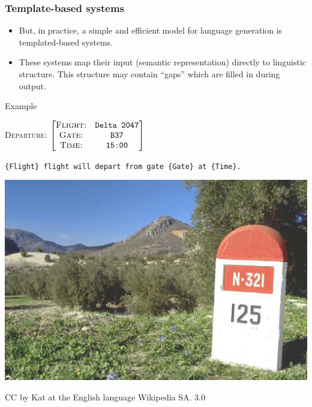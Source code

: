 \documentclass[11pt]{beamer}
\begin{document}
\begin{frame}
\frametitle{Template-based systems}
	\begin{itemize}
		\item But, in practice, a simple and efficient model for language generation is templated-based systems.
		\pause
		\item These systems map their input (semantic representation) directly to linguistic structure. This structure may contain ``gaps'' which are filled in during output.
	\end{itemize}
	\pause
	\begin{block}{Example}
		\vspace{10pt}
		\begin{center}
		\textsc{Departure:} \small 
				$\begin{bmatrix}
						\textsc{Flight:}    & \texttt{Delta 2047}\\ 
						\textsc{Gate:}     	& \texttt{B37}\\ 
						\textsc{Time:}  		& \texttt{15:00}\\ 
				\end{bmatrix}$
		\end{center}
		\small
		\begin{center}
			\texttt{\{Flight\} flight will depart from gate \{Gate\} at \{Time\}.}
		\end{center}
		\vspace{10pt}
	\end{block}
\end{frame}

\begin{frame}
	\begin{center}
		\includegraphics[width=1.0\textwidth]{milestone.eps}\\
		\begin{tiny}
			CC by Kat at the English language Wikipedia SA. 3.0
		\end{tiny}
	\end{center}
\end{frame}
\end{document}
